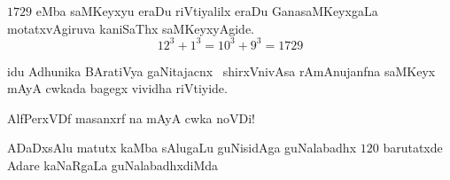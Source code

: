 $1729$ eMba saMKeyxyu eraDu riVtiyalilx eraDu GanasaMKeyxgaLa motatxvAgiruva kaniSaThx saMKeyxyAgide.
$$
12^3 + 1^3 =10^3 + 9 ^3 = 1729
$$
 
idu Adhunika BAratiVya gaNitajacnx~ shirxVnivAsa rAmAnujanfna saMKeyx mAyA cwkada bagegx vividha riVtiyide.

AlfPerxVDf  masanxrf na mAyA cwka noVDi!

ADaDxsAlu matutx kaMba sAlugaLu guNisidAga guNalabadhx $120$ barutatxde Adare kaNaRgaLa guNalabadhxdiMda 


